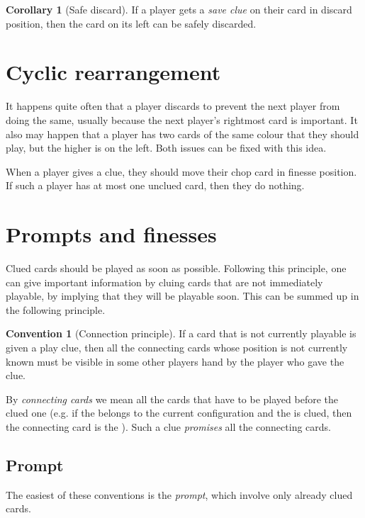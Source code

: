 \documentclass[a4paper]{article}
\theoremstyle{plain}
\theoremstyle{definition}
\newtheorem{corollary}[theorem]{Corollary}
\newtheorem{convention}[theorem]{Convention}
\begin{document}
\begin{corollary}[Safe discard]
	If a player gets a \textit{save clue} on their card in discard position, then the card on its left can be safely discarded.
\end{corollary}

\section{Cyclic rearrangement}

It happens quite often that a player discards to prevent the next player from doing the same, usually because the next player's rightmost card is important. It also may happen that a player has two cards of the same colour that they should play, but the higher is on the left. Both issues can be fixed with this idea.

When a player gives a clue, they should move their chop card in finesse position. If such a player has at most one unclued card, then they do nothing.

\section{Prompts and finesses}

Clued cards should be played as soon as possible. Following this principle, one can give important information by cluing cards that are not immediately playable, by implying that they will be playable soon. This can be summed up in the following principle.

\begin{convention}[Connection principle]
	\label{connection-principle}
	If a card that is not currently playable is given a play clue, then all the connecting cards whose position is not currently known must be visible in some other players hand by the player who gave the clue.
\end{convention}

By \textit{connecting cards} we mean all the cards that have to be played before the clued one (e.g. if the  belongs to the current configuration and the  is clued, then the connecting card is the ). Such a clue \emph{promises} all the connecting cards.

\subsection{Prompt}

The easiest of these conventions is the \textit{prompt}, which involve only already clued cards.
\end{document}

